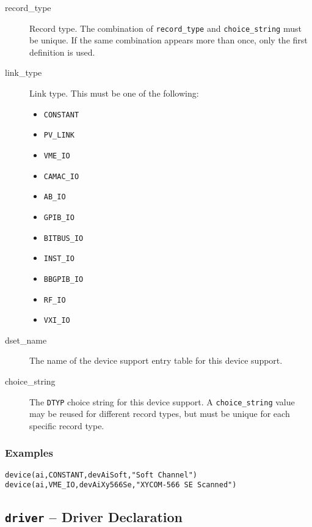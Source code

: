\begin{description}
\item [record\_type] Record type.
The combination of \verb|record_type| and \verb|choice_string| must be unique.
If the same combination appears more than once, only the first definition is used.

\item [link\_type] Link type. This must be one of the following:

\begin{itemize}
\item \verb|CONSTANT|
\item \verb|PV_LINK|
\item \verb|VME_IO|
\item \verb|CAMAC_IO|
\item \verb|AB_IO|
\item \verb|GPIB_IO|
\item \verb|BITBUS_IO|
\item \verb|INST_IO|
\item \verb|BBGPIB_IO|
\item \verb|RF_IO|
\item \verb|VXI_IO|
\end{itemize}

\item [dset\_name] The name of the device support entry table for this device support.

\item [choice\_string] The \verb|DTYP| choice string for this device support.
A \verb|choice_string| value may be reused for different record types, but must be unique for each specific record type.
\end{description}

\subsubsection{Examples}

\begin{verbatim}
device(ai,CONSTANT,devAiSoft,"Soft Channel")
device(ai,VME_IO,devAiXy566Se,"XYCOM-566 SE Scanned")
\end{verbatim}

\subsection{\texttt{driver} -- Driver Declaration}

